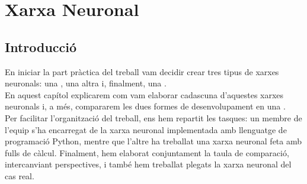 \chapter{Xarxa Neuronal}
\section{Introducció}\label{sec:intr}
En iniciar la part pràctica del treball vam decidir crear tres tipus de xarxes neuronals: una , una altra  i, finalment, una .\\

En aquest capítol explicarem com vam elaborar cadascuna d’aquestes xarxes neuronals i, a més, compararem les dues formes de desenvolupament en una .\\

Per facilitar l’organització del treball, ens hem repartit les tasques: un membre de l’equip s’ha encarregat de la xarxa neuronal implementada amb llenguatge de programació Python, mentre que l’altre ha treballat una xarxa neuronal feta amb fulls de càlcul. Finalment, hem elaborat conjuntament la taula de comparació, intercanviant perspectives, i també hem treballat plegats la xarxa neuronal del cas real.\\

